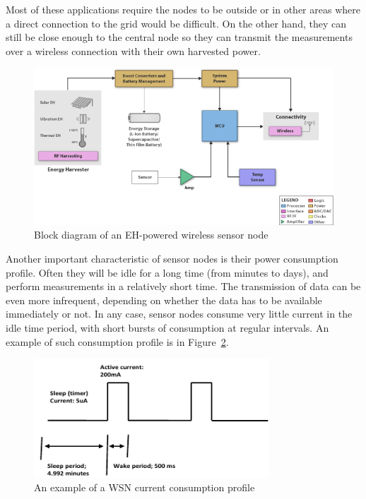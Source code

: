 \documentclass[a4paper,10pt]{article}
\begin{document}
Most of these applications require the nodes to be outside or in other areas where a direct connection to the grid would be difficult. On the other hand, they can still be close enough to the central node so they can transmit the measurements over a wireless connection with their own harvested power. 

\begin{figure}[h]
 \centering
\includegraphics[width=.9\textwidth]{./Slike/EH-Block}
\caption{Block diagram of an \ac{EH}-powered wireless sensor node~\cite{ti:eh}}
\label{fig:block-sensor}
\end{figure}


Another important characteristic of sensor nodes is their power consumption profile. Often they will be idle for a long time (from minutes to days), and perform measurements in a relatively short time. The transmission of data can be even more infrequent, depending on whether the data has to be available immediately or not. In any case, sensor nodes consume very little current in the idle time period, with short bursts of consumption at regular intervals. An example of such consumption profile is in Figure~\ref{fig:wsn-consumption}. 

\begin{figure}[h]
\centering
 \includegraphics[width=250pt]{./Slike/wsn-current-profile}
 \caption{An example of a \ac{WSN} current consumption profile~\cite{cap-wsn-ieee}}
\label{fig:wsn-consumption}
\end{figure}
\end{document}
